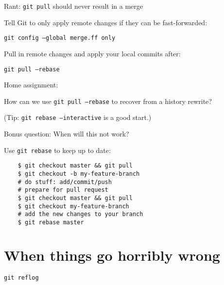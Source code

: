 \documentclass[11pt,xetex]{beamer}
\begin{document}
\begin{frame}[fragile]{}
  \Large
  Rant: \texttt{git pull} should never result in a merge
\end{frame}

\begin{frame}[fragile]{}
  \Large
  Tell Git to only apply remote changes if they can be fast-forwarded:

  \begin{center}
    \texttt{git config --global merge.ff only}
  \end{center}
\end{frame}

\begin{frame}[fragile]{}
  \Large
  Pull in remote changes and apply your local commits after:

  \begin{center}
    \texttt{git pull --rebase}
  \end{center}
\end{frame}

\begin{frame}[fragile]{}
  \LARGE Home assignment:

  \Large
  How can we use \texttt{git pull --rebase}
  to recover from a history rewrite?
  \pause

  \normalsize
  (Tip: \texttt{git rebase --interactive} is a good start.)
  \pause

  Bonus question: When will this not work?
\end{frame}

\begin{frame}[fragile]{}
  \Large
  Use \texttt{git rebase} to keep up to date:

  \begin{verbatim}
    $ git checkout master && git pull
    $ git checkout -b my-feature-branch
    # do stuff: add/commit/push
    # prepare for pull request
    $ git checkout master && git pull
    $ git checkout my-feature-branch
    # add the new changes to your branch
    $ git rebase master
  \end{verbatim}
\end{frame}

\section*{When things go horribly wrong}

\begin{frame}{}
  \begin{center}
    \Huge \texttt{git reflog}
  \end{center}
\end{frame}
\end{document}
